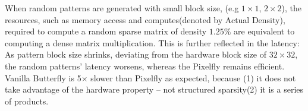 When random patterns are generated with small block size, (e.g $1\times1$, $2\times2$), the resources, such as memory access and computes(denoted by Actual Density), required  to compute a random sparse matrix of density $1.25\%$ are equivalent to computing a dense matrix multiplication. This is further reflected in the latency: As pattern block size shrinks, deviating from the hardware block size of $32\times 32$, the random patterns' latency worsens, whereas the Pixelfly remains efficient.
Vanilla Butterfly is 5$\times$ slower than Pixelfly as expected,  because (1) it does not take advantage of the hardware property -- not structured sparsity(2) it is a series of products. 
\begin{table}[!htbp]
\centering
{}
\caption{Microbenchmarking of different patterns. Given GPU processes the matrix block by block of size 32 $\times$ 32, random block pattern's latency increases as the block size shrinks, while Pixelfly remains efficient. We measure the latency by averaging 100 runs of batch size 4096 for each configuration.}
\label{table:throughput}
\end{table}

